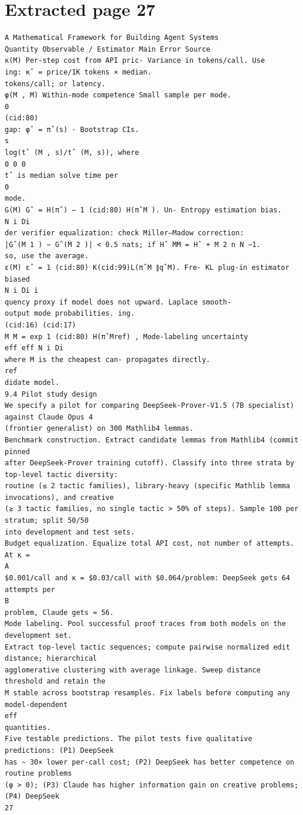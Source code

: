 \documentclass[11pt]{article}
\begin{document}
\section*{Extracted page 27}
\begin{verbatim}
A Mathematical Framework for Building Agent Systems
Quantity Observable / Estimator Main Error Source
κ(M) Per-step cost from API pric- Variance in tokens/call. Use
ing: κˆ = price/1K tokens × median.
tokens/call; or latency.
φ(M , M) Within-mode competence Small sample per mode.
0
(cid:80)
gap: φˆ = πˆ(s) · Bootstrap CIs.
s
log(tˆ (M , s)/tˆ (M, s)), where
0 0 0
tˆ is median solve time per
0
mode.
G(M) Gˆ = H(πˆ) − 1 (cid:80) H(πˆM ). Un- Entropy estimation bias.
N i Di
der verifier equalization: check Miller–Madow correction:
|Gˆ(M 1 ) − Gˆ(M 2 )| < 0.5 nats; if Hˆ MM = Hˆ + M 2 n N −1.
so, use the average.
ε(M) εˆ = 1 (cid:80) K(cid:99)L(πˆM ∥qˆM). Fre- KL plug-in estimator biased
N i Di i
quency proxy if model does not upward. Laplace smooth-
output mode probabilities. ing.
(cid:16) (cid:17)
M M = exp 1 (cid:80) H(πˆMref) , Mode-labeling uncertainty
eff eff N i Di
where M is the cheapest can- propagates directly.
ref
didate model.
9.4 Pilot study design
We specify a pilot for comparing DeepSeek-Prover-V1.5 (7B specialist) against Claude Opus 4
(frontier generalist) on 300 Mathlib4 lemmas.
Benchmark construction. Extract candidate lemmas from Mathlib4 (commit pinned
after DeepSeek-Prover training cutoff). Classify into three strata by top-level tactic diversity:
routine (≤ 2 tactic families), library-heavy (specific Mathlib lemma invocations), and creative
(≥ 3 tactic families, no single tactic > 50% of steps). Sample 100 per stratum; split 50/50
into development and test sets.
Budget equalization. Equalize total API cost, not number of attempts. At κ =
A
$0.001/call and κ = $0.03/call with $0.064/problem: DeepSeek gets 64 attempts per
B
problem, Claude gets ≈ 56.
Mode labeling. Pool successful proof traces from both models on the development set.
Extract top-level tactic sequences; compute pairwise normalized edit distance; hierarchical
agglomerative clustering with average linkage. Sweep distance threshold and retain the
M stable across bootstrap resamples. Fix labels before computing any model-dependent
eff
quantities.
Five testable predictions. The pilot tests five qualitative predictions: (P1) DeepSeek
has ∼ 30× lower per-call cost; (P2) DeepSeek has better competence on routine problems
(φ > 0); (P3) Claude has higher information gain on creative problems; (P4) DeepSeek
27
\end{verbatim}
\end{document}
